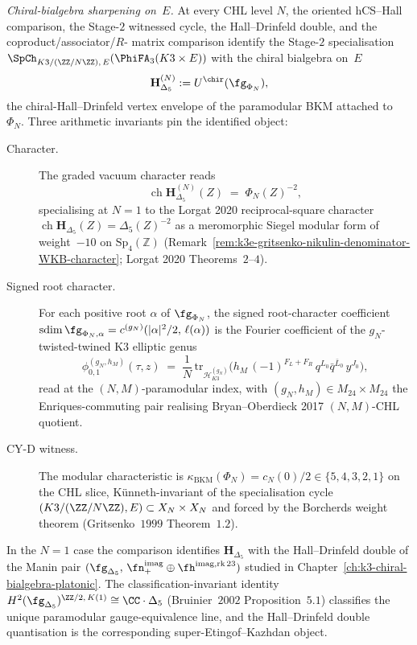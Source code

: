 \begin{conjecture}
\smallskip
\noindent\emph{Chiral-bialgebra sharpening on~$E$.} At every CHL level
$N$, the oriented hCS--Hall comparison, the Stage-$2$ witnessed
cycle, the Hall--Drinfeld double, and the coproduct/associator/$R$-
matrix comparison identify the Stage-$2$ specialisation
$\SpCh_{K3/(\ZZ/N\ZZ),\, E}(\PhiFA_3(K3 \times E))$ with the chiral
bialgebra on~$E$
\[
 \mathbf{H}_{\Delta_5}^{(N)} := U^{\chir}(\fg_{\Phi_N}),
\]
the chiral-Hall--Drinfeld vertex envelope of the paramodular BKM
attached to~$\Phi_N$. Three arithmetic invariants pin the identified
object:
\begin{description}
 \item[Character.] The graded vacuum character reads
 \[
 \operatorname{ch}\mathbf{H}_{\Delta_5}^{(N)}(Z) \;=\; \Phi_N(Z)^{-2},
 \]
 specialising at $N = 1$ to the Lorgat 2020 reciprocal-square character $\operatorname{ch}\mathbf{H}_{\Delta_5}(Z) = \Delta_5(Z)^{-2}$ as a meromorphic Siegel modular form of weight~$-10$ on $\mathrm{Sp}_4(\mathbb{Z})$ (Remark~\ref{rem:k3e-gritsenko-nikulin-denominator-WKB-character}; Lorgat 2020 Theorems~$2$--$4$).
 \item[Signed root character.] For each positive root $\alpha$ of $\fg_{\Phi_N}$, the signed root-character coefficient
 \(\operatorname{sdim}\fg_{\Phi_N,\alpha}
 = c^{(g_N)}(|\alpha|^2/2,\, \ell(\alpha))\)
 is the Fourier coefficient of the $g_N$-twisted-twined K3 elliptic genus
 \[
 \phi_{0,1}^{(g_N, h_M)}(\tau, z) \;=\; \frac{1}{N}\,\mathrm{tr}_{\mathcal{H}_{K3}^{(g_N)}}\bigl(h_M\,(-1)^{F_L + F_R}\,q^{L_0}\bar{q}^{\bar{L}_0}\,y^{J_0}\bigr),
 \]
 read at the $(N, M)$-paramodular index, with $(g_N, h_M) \in M_{24} \times M_{24}$ the Enriques-commuting pair realising Bryan--Oberdieck 2017 $(N, M)$-CHL quotient.
 \item[CY-D witness.] The modular characteristic is $\kappa_{\mathrm{BKM}}(\Phi_N) = c_N(0)/2 \in \{5, 4, 3, 2, 1\}$ on the CHL slice, Künneth-invariant of the specialisation cycle $(K3/(\ZZ/N\ZZ), E) \subset X_N \times X_N$ and forced by the Borcherds weight theorem (Gritsenko~$1999$ Theorem~$1.2$).
\end{description}
In the $N = 1$ case the comparison identifies
$\mathbf{H}_{\Delta_5}$ with the Hall--Drinfeld double of the Manin pair
$(\fg_{\Delta_5},\, \fn_+^{\mathrm{imag}} \oplus
\fh^{\mathrm{imag, rk\,23}})$ studied in
Chapter~\ref{ch:k3-chiral-bialgebra-platonic}. The
classification-invariant identity
$H^2(\fg_{\Delta_5})^{\ZZ/2,\,K(1)} \cong \CC \cdot \Delta_5$
(Bruinier~$2002$ Proposition~$5.1$) classifies the unique
paramodular gauge-equivalence line, and the Hall--Drinfeld double
quantisation is the corresponding
super-Etingof--Kazhdan object.
\end{conjecture}

